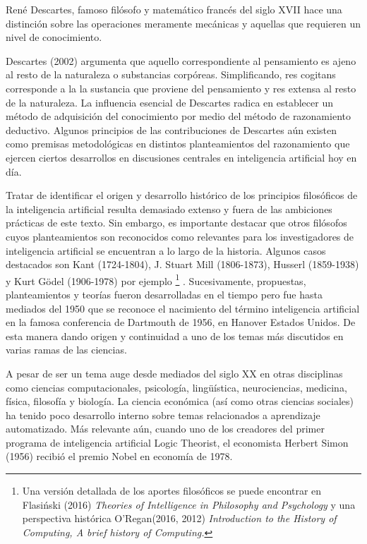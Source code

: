 \documentclass[letterpaper,12pt, spanish, oneside]{book} %
\let\oldfootnote\footnote
\renewcommand{\footnote}[1]{%
  \begingroup%
  \linespread{1.2}%
  \oldfootnote{#1}%
  \endgroup%
}
\begin{document}
René Descartes, famoso filósofo y matemático francés del siglo XVII hace una distinción sobre las operaciones meramente mecánicas y aquellas que requieren un nivel de conocimiento. 

Descartes (2002) argumenta que aquello correspondiente al pensamiento es ajeno al resto de la naturaleza o substancias corpóreas. Simplificando, res cogitans corresponde a la la sustancia que proviene del pensamiento y res extensa al resto de la naturaleza.  La influencia esencial de Descartes radica en establecer un método de adquisición del conocimiento por medio del método de razonamiento deductivo. Algunos principios de las contribuciones de Descartes aún existen como premisas metodológicas en distintos planteamientos del razonamiento que ejercen ciertos desarrollos en discusiones centrales en inteligencia artificial hoy en día. 

Tratar de identificar el origen y desarrollo histórico de los principios filosóficos de la inteligencia artificial resulta demasiado extenso y fuera de las ambiciones prácticas de este texto. Sin embargo, es importante destacar que otros filósofos cuyos planteamientos son reconocidos como relevantes para los investigadores de inteligencia artificial se encuentran a lo largo de la historia. Algunos casos destacados son Kant (1724-1804), J. Stuart Mill (1806-1873), Husserl (1859-1938) y Kurt Gödel (1906-1978) por ejemplo\footnote{Una versión detallada de los aportes filosóficos se puede encontrar en Flasiński (2016)\textit{ Theories of Intelligence in Philosophy and Psychology} y una perspectiva histórica O’Regan(2016, 2012) \textit{Introduction to the History of Computing, A brief history of Computing.}}. Sucesivamente, propuestas, planteamientos y  teorías fueron desarrolladas en el tiempo pero fue hasta mediados del 1950 que se reconoce el nacimiento del término inteligencia artificial en la famosa conferencia de Dartmouth de 1956, en Hanover Estados Unidos. De esta manera dando origen y continuidad a uno de los temas más discutidos en varias ramas de las ciencias.

A pesar de ser un tema auge desde mediados del siglo XX en otras disciplinas como ciencias computacionales, psicología, lingüística, neurociencias, medicina, física, filosofía y biología. La ciencia económica (así como otras ciencias sociales) ha tenido poco desarrollo interno sobre temas relacionados a aprendizaje automatizado. Más relevante aún, cuando uno de los creadores del primer programa de inteligencia artificial Logic Theorist, el economista Herbert Simon (1956) recibió el premio Nobel en economía de 1978.
\end{document}
